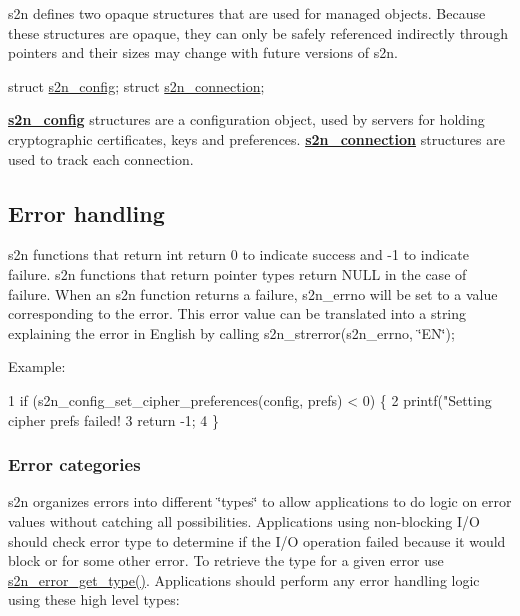 s2n defines two opaque structures that are used for managed objects. Because these structures are opaque, they can only be safely referenced indirectly through pointers and their sizes may change with future versions of s2n.


\begin{DoxyCode}
\textcolor{keyword}{struct }\hyperlink{structs2n__config}{s2n\_config};
\textcolor{keyword}{struct }\hyperlink{structs2n__connection}{s2n\_connection};
\end{DoxyCode}


{\bfseries \hyperlink{structs2n__config}{s2n\+\_\+config}} structures are a configuration object, used by servers for holding cryptographic certificates, keys and preferences. {\bfseries \hyperlink{structs2n__connection}{s2n\+\_\+connection}} structures are used to track each connection.

\subsection*{Error handling}

s2n functions that return \textquotesingle{}int\textquotesingle{} return 0 to indicate success and -\/1 to indicate failure. s2n functions that return pointer types return N\+U\+LL in the case of failure. When an s2n function returns a failure, s2n\+\_\+errno will be set to a value corresponding to the error. This error value can be translated into a string explaining the error in English by calling s2n\+\_\+strerror(s2n\+\_\+errno, \char`\"{}\+E\+N\char`\"{});

Example\+:


\begin{DoxyCode}
1 if (s2n\_config\_set\_cipher\_preferences(config, prefs) < 0) \{
2     printf("Setting cipher prefs failed! %
3     return -1;
4 \}
\end{DoxyCode}


\subsubsection*{Error categories}

s2n organizes errors into different \char`\"{}types\char`\"{} to allow applications to do logic on error values without catching all possibilities. Applications using non-\/blocking I/O should check error type to determine if the I/O operation failed because it would block or for some other error. To retrieve the type for a given error use {\ttfamily \hyperlink{s2n_8h_a526856aac3b44999c3f716a3df648da1}{s2n\+\_\+error\+\_\+get\+\_\+type()}}. Applications should perform any error handling logic using these high level types\+:


